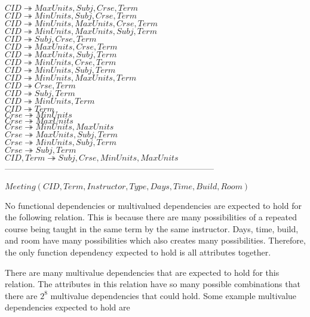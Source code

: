 $CID \twoheadrightarrow MaxUnits, Subj, Crse, Term$\\
$CID \twoheadrightarrow MinUnits, Subj, Crse, Term$\\
$CID \twoheadrightarrow MinUnits, MaxUnits, Crse, Term$\\
$CID \twoheadrightarrow MinUnits, MaxUnits, Subj, Term$\\
$CID \twoheadrightarrow Subj, Crse, Term$\\
$CID \twoheadrightarrow MaxUnits, Crse, Term$\\
$CID \twoheadrightarrow MaxUnits, Subj, Term$\\
$CID \twoheadrightarrow MinUnits, Crse, Term$\\
$CID \twoheadrightarrow MinUnits, Subj, Term$\\
$CID \twoheadrightarrow MinUnits, MaxUnits, Term$\\
$CID \twoheadrightarrow Crse, Term$\\
$CID \twoheadrightarrow Subj, Term$\\
$CID \twoheadrightarrow MinUnits, Term$\\
$CID \twoheadrightarrow Term$\\

$Crse \twoheadrightarrow MinUnits$\\
$Crse \twoheadrightarrow MaxUnits$\\
$Crse \twoheadrightarrow MinUnits, MaxUnits$\\

$Crse \twoheadrightarrow MaxUnits, Subj, Term$\\
$Crse \twoheadrightarrow MinUnits, Subj, Term$\\
$Crse \twoheadrightarrow Subj, Term$\\

$CID,Term \twoheadrightarrow Subj,Crse,MinUnits,MaxUnits$
---------------------------------------------------------------------------

$Meeting(CID, Term, Instructor, Type, Days, Time, Build, Room)$

No functional dependencies or multivalued dependencies are expected to hold for the following relation. This is because there are many possibilities of a repeated course being taught in the same term by the same instructor. Days, time, build, and room have many possibilities which also creates many possibilities. Therefore, the only function dependency expected to hold is all attributes together. 

There are many multivalue dependencies that are expected to hold for this relation. The attributes in this relation have so many possible combinations that there are $2^{8}$ multivalue dependencies that could hold. Some example multivalue dependencies expected to hold are

